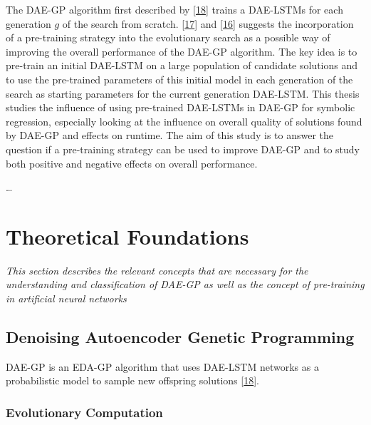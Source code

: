 \documentclass[
  11pt,
]{article}
\begin{document}
The DAE-GP algorithm first described by {[}\protect\hyperlink{ref-dae-gp_2020_rtree}{18}{]} trains a DAE-LSTMs for each generation \(g\) of the search from scratch.
{[}\protect\hyperlink{ref-dae-gp_2022_symreg}{17}{]} and {[}\protect\hyperlink{ref-daegp_explore_exploit}{16}{]} suggests the incorporation of a pre-training strategy into the evolutionary search as a possible way of improving the overall performance of the DAE-GP algorithm.
The key idea is to pre-train an initial DAE-LSTM on a large population of candidate solutions and to use the pre-trained parameters of this initial model in each generation of the search as starting parameters for the current generation DAE-LSTM.
This thesis studies the influence of using pre-trained DAE-LSTMs in DAE-GP for symbolic regression, especially looking at the influence on overall quality of solutions found by DAE-GP and effects on runtime.
The aim of this study is to answer the question if a pre-training strategy can be used to improve DAE-GP and to study both positive and negative effects on overall performance.

\ldots{}

\hypertarget{theoretical-foundations}{%
\section{Theoretical Foundations}\label{theoretical-foundations}}

\emph{This section describes the relevant concepts that are necessary for the understanding and classification of DAE-GP as well as the concept of pre-training in artificial neural networks}

\hypertarget{denoising-autoencoder-genetic-programming}{%
\subsection{Denoising Autoencoder Genetic Programming}\label{denoising-autoencoder-genetic-programming}}

DAE-GP is an EDA-GP algorithm that uses DAE-LSTM networks as a probabilistic model to sample new offspring solutions {[}\protect\hyperlink{ref-dae-gp_2020_rtree}{18}{]}.

\hypertarget{evolutionary-computation}{%
\subsubsection{Evolutionary Computation}\label{evolutionary-computation}}
\end{document}
